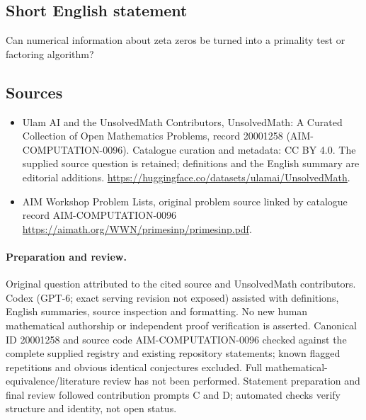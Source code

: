 \documentclass[11pt]{article}
\begin{document}
\subsection{Short English statement}
Can numerical information about zeta zeros be turned into a primality test or factoring algorithm?
\subsection{Sources}
\begin{itemize}
\item[\hypertarget{source:20001258:1}{S1}] Ulam AI and the UnsolvedMath Contributors, UnsolvedMath: A Curated Collection of Open Mathematics Problems, record 20001258 (AIM-COMPUTATION-0096). Catalogue curation and metadata: CC BY 4.0. The supplied source question is retained; definitions and the English summary are editorial additions.
\url{https://huggingface.co/datasets/ulamai/UnsolvedMath}.
\item[\hypertarget{source:20001258:2}{S2}] AIM Workshop Problem Lists, original problem source linked by catalogue record AIM-COMPUTATION-0096
\url{https://aimath.org/WWN/primesinp/primesinp.pdf}.
\end{itemize}
\paragraph{Preparation and review.}
Original question attributed to the cited source and UnsolvedMath contributors. Codex (GPT-6; exact serving revision not exposed) assisted with definitions, English summaries, source inspection and formatting. No new human mathematical authorship or independent proof verification is asserted. Canonical ID 20001258 and source code AIM-COMPUTATION-0096 checked against the complete supplied registry and existing repository statements; known flagged repetitions and obvious identical conjectures excluded. Full mathematical-equivalence/literature review has not been performed. Statement preparation and final review followed contribution prompts C and D; automated checks verify structure and identity, not open status.
\label{end:20001258}
\end{document}
